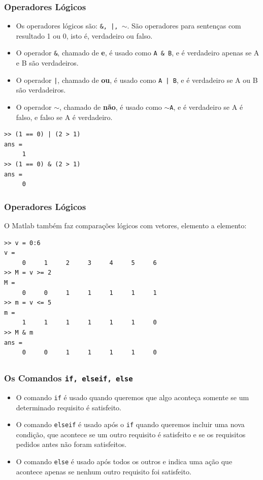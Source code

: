 \documentclass{beamer}
\begin{document}
\begin{frame}[fragile]
\frametitle{Operadores L\'ogicos}

\begin{itemize}
\item<1->Os operadores l\'ogicos s\~ao: {\tt \&, |, $\sim$}. S\~ao operadores para senten\c{c}as com resultado 1 ou 0, isto \'e, verdadeiro ou falso.
\item<2->O operador {\tt \&}, chamado de {\bf e}, \'e usado como \verb+A & B+, e \'e verdadeiro apenas se A e B s\~ao verdadeiros.
\item<3->O operador {\tt |}, chamado de {\bf ou}, \'e usado como \verb+A | B+, e \'e verdadeiro se A ou B s\~ao verdadeiros.
\item<4->O operador $\sim$, chamado de {\bf n\~ao}, \'e usado como {\tt $\sim$A}, e \'e verdadeiro se A \'e falso, e falso se A \'e verdadeiro.
\end{itemize}
\pause \pause \pause \pause
{\scriptsize
\begin{verbatim}
>> (1 == 0) | (2 > 1)
ans =
     1
>> (1 == 0) & (2 > 1)
ans =
     0
\end{verbatim}}
\end{frame}

\begin{frame}[fragile]
\frametitle{Operadores L\'ogicos}

O Matlab tamb\'em faz compara\c{c}\~oes l\'ogicos com vetores, elemento a elemento:
{\small
\begin{verbatim}
>> v = 0:6
v =
     0     1     2     3     4     5     6
>> M = v >= 2
M =
     0     0     1     1     1     1     1
>> m = v <= 5
m =
     1     1     1     1     1     1     0
>> M & m
ans =
     0     0     1     1     1     1     0
\end{verbatim}
}
\end{frame}

\subsection[Os Comandos if, elseif, else]{}

\begin{frame}[fragile]
\frametitle{Os Comandos {\tt if, elseif, else}}

\begin{itemize}
\item<1-> O comando {\tt if} \'e usado quando queremos que algo aconte\c{c}a somente se um determinado requisito \'e satisfeito.
\item<2-> O comando {\tt elseif} \'e usado ap\'os o {\tt if} quando queremos incluir uma nova condi\c{c}\~ao, que acontece se um outro requisito \'e satisfeito e se os requisitos pedidos antes n\~ao foram satisfeitos.
\item<3-> O comando {\tt else} \'e usado ap\'os todos os outros e indica uma a\c{c}\~ao que acontece apenas se nenhum outro requisito foi satisfeito.
\end{itemize}

\end{frame}
\end{document}
